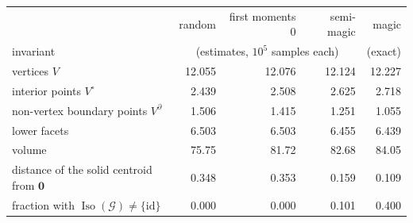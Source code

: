 \begin{tabular}{l rrrr}
\toprule
 & random & first moments $0$ & semi-magic & magic\\
invariant & \multicolumn{3}{c}{(estimates, $10^5$ samples each)} & (exact)\\
\midrule
vertices $V$ & 12.055 & 12.076 & 12.124 & 12.227\\
interior points $V^\circ$ & 2.439 & 2.508 & 2.625 & 2.718\\
non-vertex boundary points $V^\partial$ & 1.506 & 1.415 & 1.251 & 1.055\\
lower facets & 6.503 & 6.503 & 6.455 & 6.439\\
volume & 75.75 & 81.72 & 82.68 & 84.05\\
distance of the solid centroid from $\mathbf 0$ & 0.348 & 0.353 & 0.159 & 0.109\\
fraction with $\operatorname{Iso}(\mathcal G)\ne\{\mathrm{id}\}$ & 0.000 & 0.000 & 0.101 & 0.400\\
\bottomrule
\end{tabular}
